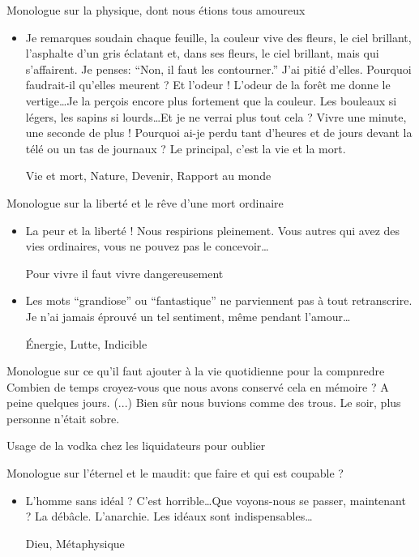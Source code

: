 \documentclass[french,a4paper,11pt,answers]{exam}
\newcommand{\cit}[2]{\og #1 \fg{} \begin{solution}{ #2 }\end{solution}} %
\begin{document}
	\begin{cadre}{Monologue sur la physique{,} dont nous étions tous amoureux}
		\begin{itemize}
			\item \cit{Je remarques soudain chaque feuille, la couleur vive des fleurs, le ciel brillant, l'asphalte d'un gris éclatant et, dans ses fleurs, le ciel brillant, mais qui s'affairent. Je penses: “Non, il faut les contourner.'' J'ai pitié d'elles. Pourquoi faudrait-il qu'elles meurent ? Et l'odeur ! L'odeur de la forêt me donne le vertige\ldots Je la perçois encore plus fortement que la couleur. Les bouleaux si légers, les sapins si lourds\ldots Et je ne verrai plus tout cela ? Vivre une minute, une seconde de plus ! Pourquoi ai-je perdu tant d'heures et de jours devant la télé ou un tas de journaux ? Le principal, c'est la vie et la mort.}
				{Vie et mort, Nature, Devenir, Rapport au monde}
		\end{itemize}
	\end{cadre}
	
	\begin{cadre}{Monologue sur la liberté et le rêve d'une mort ordinaire}
		\begin{itemize}
			\item \cit{La peur et la liberté ! Nous respirions pleinement. Vous autres qui avez des vies ordinaires, vous ne pouvez pas le concevoir\ldots}
				{Pour vivre il faut vivre dangereusement}
			\item \cit{Les mots “grandiose'' ou “fantastique'' ne parviennent pas à tout retranscrire. Je n'ai jamais éprouvé un tel sentiment, même pendant l'amour\ldots}
				{Énergie, Lutte, Indicible}
		\end{itemize}
	\end{cadre}

	\begin{cadre}{Monologue sur ce qu'il faut ajouter à la vie quotidienne pour la compnredre}
		\cit {Combien de temps croyez-vous que nous avons conservé cela en mémoire ? A peine quelques jours. (...) Bien sûr nous buvions comme des trous. Le soir, plus personne n'était sobre.}
		{Usage de la vodka chez les liquidateurs pour oublier}
	\end{cadre}
	
	\begin{cadre}{Monologue sur l'éternel et le maudit: que faire et qui est coupable ?}
		\begin{itemize}
			\item \cit{L'homme sans idéal ? C'est horrible\ldots Que voyons-nous se passer, maintenant ? La débâcle. L'anarchie. Les idéaux sont indispensables\ldots}
				{Dieu, Métaphysique}
		\end{itemize}
	\end{cadre}
	
\end{document}
